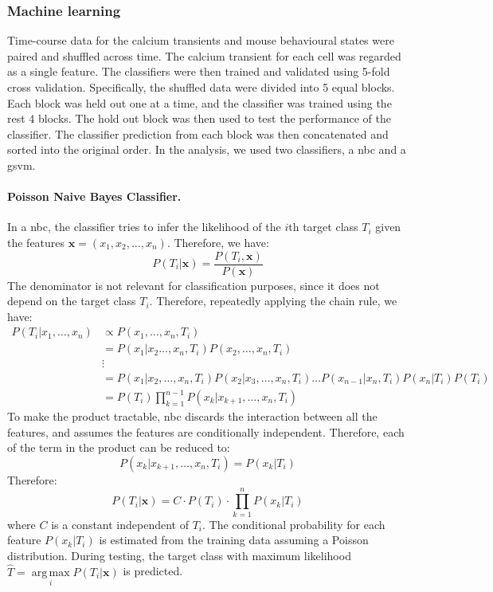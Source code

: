 \subsubsection{Machine learning}

Time-course data for the calcium transients and mouse behavioural states were paired and shuffled across time. The calcium transient for each cell was regarded as a single feature. The classifiers were then trained and validated using 5-fold cross validation. Specifically, the shuffled data were divided into 5 equal blocks. Each block was held out one at a time, and the classifier was trained using the rest 4 blocks. The hold out block was then used to test the performance of the classifier. The classifier prediction from each block was then concatenated and sorted into the original order. In the analysis, we used two classifiers, a \gls{nbc} and a \gls{gsvm}. 

\paragraph{Poisson Naive Bayes Classifier.}
In a \gls{nbc}, the classifier tries to infer the likelihood of the $i$th target class $T_i$ given the features $\mathbf{x} = (x_1, x_2, \dots, x_n)$. Therefore, we have:
\begin{equation*}
    P(T_i|\mathbf{x}) = \frac{P(T_i, \mathbf{x})}{P(\mathbf{x})}
\end{equation*}
The denominator is not relevant for classification purposes, since it does not depend on the target class $T_i$. Therefore, repeatedly applying the chain rule, we have:
\begin{align*}
    P(T_i|x_1, \dots, x_n) &\propto P(x_1, \dots, x_n, T_i) \\
                           &= P(x_1|x_2 \dots, x_n, T_i) P(x_2, \dots, x_n, T_i) \\
                           &\vdots \\
                           &= P(x_1|x_2, \dots, x_n, T_i)  P(x_2|x_3, \dots, x_n, T_i) \ldots  P(x_{n-1}|x_n, T_i)  P(x_n|T_i)  P(T_i) \\
                           &= P(T_i)  \prod_{k=1}^{n-1} P(x_k|x_{k+1}, \dots, x_n, T_i)
\end{align*}
To make the product tractable, \gls{nbc} discards the interaction between all the features, and assumes the features are conditionally independent. Therefore, each of the term in the product can be reduced to:
\begin{equation*}
    P(x_k|x_{k+1}, \dots, x_n, T_i) = P(x_k|T_i)
\end{equation*}
Therefore:
\begin{equation*}
    P(T_i|\mathbf{x}) = C\cdot P(T_i) \cdot \prod_{k=1}^n P(x_k|T_i)
\end{equation*}
where $C$ is a constant independent of $T_i$. The conditional probability for each feature $P(x_k|T_i)$ is estimated from the training data assuming a Poisson distribution. During testing, the target class with maximum likelihood $\hat{T}=\underset{i}{\operatorname{arg\,max}} P(T_i|\mathbf{x})$ is predicted.

